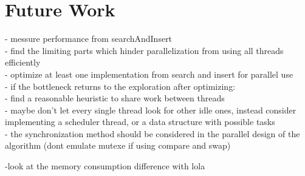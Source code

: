 \chapter{Future Work}
- messure performance from searchAndInsert\\
- find the limiting parts which hinder parallelization from using all threads efficiently\\
- optimize at least one implementation from search and insert for parallel use\\
- if the bottleneck returns to the exploration after optimizing:\\
- find a reasonable heuristic to share work between threads\\
- maybe don't let every single thread look for other idle ones, instead consider implementing a scheduler thread, or a data structure with possible tasks\\

- the synchronization method should be considered in the parallel design of the algorithm (dont emulate mutexe if using compare and swap)

-look at the memory consumption difference with lola